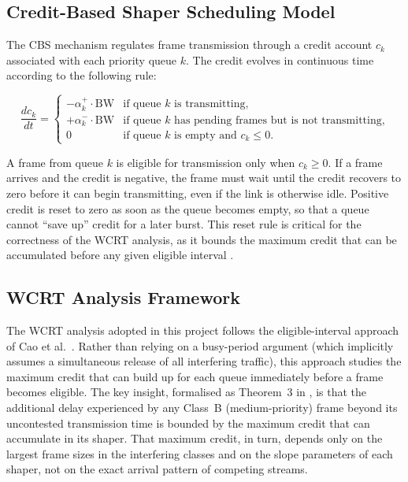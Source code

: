 \documentclass[11pt,a4paper]{article}
\begin{document}
\subsection{Credit-Based Shaper Scheduling Model}

The CBS mechanism regulates frame transmission through a credit account
$c_k$ associated with each priority queue $k$.
The credit evolves in continuous time according to the following rule:

\begin{equation}
\frac{dc_k}{dt} =
\begin{cases}
-\alpha_k^{+} \cdot \mathrm{BW} & \text{if queue } k \text{ is transmitting,} \\
+\alpha_k^{-} \cdot \mathrm{BW} & \text{if queue } k \text{ has pending frames but is not transmitting,} \\
0 & \text{if queue } k \text{ is empty and } c_k \leq 0.
\end{cases}
\label{eq:credit}
\end{equation}

A frame from queue $k$ is eligible for transmission only when $c_k \geq 0$.
If a frame arrives and the credit is negative, the frame must wait until the
credit recovers to zero before it can begin transmitting, even if the link
is otherwise idle.
Positive credit is reset to zero as soon as the queue becomes empty, so
that a queue cannot ``save up'' credit for a later burst.
This reset rule is critical for the correctness of the WCRT analysis, as it
bounds the maximum credit that can be accumulated before any given eligible
interval \cite{Cao2016}.

\subsection{WCRT Analysis Framework}

The WCRT analysis adopted in this project follows the eligible-interval approach
of Cao et al.\ \cite{Cao2016,Cao2018}.
Rather than relying on a busy-period argument (which implicitly assumes
a simultaneous release of all interfering traffic), this approach studies
the maximum credit that can build up for each queue immediately before a
frame becomes eligible.
The key insight, formalised as Theorem~3 in \cite{Cao2016}, is that the
additional delay experienced by any Class~B (medium-priority) frame beyond
its uncontested transmission time is bounded by the maximum credit that
can accumulate in its shaper.
That maximum credit, in turn, depends only on the largest frame sizes in
the interfering classes and on the slope parameters of each shaper, not
on the exact arrival pattern of competing streams.
\end{document}
